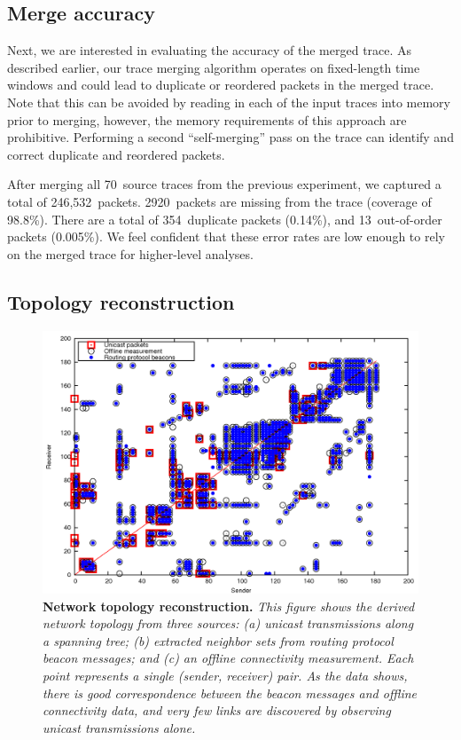 \subsection{Merge accuracy}


Next, we are interested in evaluating the accuracy of the merged
trace. As described earlier, our trace merging algorithm 
operates on fixed-length time windows and could lead to 
duplicate or reordered packets in the merged trace. 
Note that this can be avoided by reading in each of the
input traces into memory prior to merging, however, the memory
requirements of this approach are prohibitive. Performing a second
``self-merging'' pass on the trace can identify and correct duplicate
and reordered packets.

After merging all 70~source traces from the previous
experiment, we captured a total of 246,532~packets.
2920~packets are missing from the trace (coverage of 98.8\%). 
There are a total of 354~duplicate packets (0.14\%), 
and 13~out-of-order packets (0.005\%).
We feel confident that these error rates are low enough to rely on
the merged trace for higher-level analyses.

\subsection{Topology reconstruction}

\begin{figure}[t]
\begin{center}
\includegraphics[width=0.6\hsize]{./resources/livenet-sensys07/figs/topology/validation/topology-compare.png}
\end{center}
\caption{\small {\bf Network topology reconstruction.}
{\em 
This figure shows the derived network topology from three
sources: (a) unicast transmissions along a spanning tree;
(b) extracted neighbor sets from routing protocol beacon messages;
and (c) an offline connectivity measurement. Each point represents a
single {\em (sender, receiver)} pair. As the data shows, there is
good correspondence between the beacon messages and offline
connectivity data, and very few links are discovered by observing
unicast transmissions alone.}}
\label{fig-topology-validation}
\end{figure}

